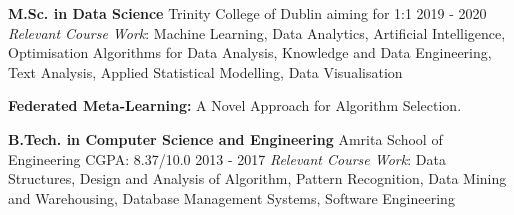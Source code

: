 \begin{cventries}
  \cventry
    {\textbf{M.Sc. in Data Science}}
    {Trinity College of Dublin}
    {aiming for 1:1}
    {2019 - 2020}
    {\textit{Relevant Course Work}: Machine Learning, Data Analytics, Artificial Intelligence, Optimisation Algorithms for Data Analysis, Knowledge and Data Engineering, Text Analysis, Applied Statistical Modelling, Data Visualisation}
    
  \begin{cvskills}
    {\textbf{Federated Meta-Learning:} A Novel Approach for Algorithm Selection.}
  \end{cvskills}
  
  \cventry
    {\textbf{B.Tech. in Computer Science and Engineering}}
    {Amrita School of Engineering}
    {CGPA: 8.37/10.0}
    {2013 - 2017}
    {\textit{Relevant Course Work}: Data Structures, Design and Analysis of Algorithm, Pattern Recognition, Data Mining and Warehousing, Database Management Systems, Software Engineering}
\end{cventries}
